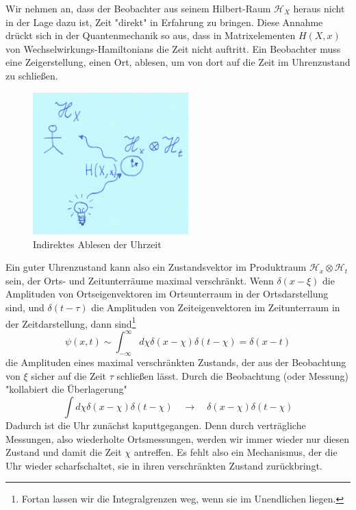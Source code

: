 \documentclass[12pt]{article}
\begin{document}
Wir nehmen an, dass der Beobachter aus seinem Hilbert-Raum $\mathscr{H}_X$ heraus nicht in der Lage dazu ist, Zeit "direkt" in Erfahrung zu bringen. Diese Annahme drückt sich in der Quantenmechanik so aus, dass in Matrixelementen $H(X,x)$ von Wechselwirkungs-Hamiltonians die Zeit nicht auftritt. Ein Beobachter muss eine Zeigerstellung, einen Ort, ablesen, um von dort auf die Zeit im Uhrenzustand zu schließen. 

\begin{figure}[!h]\begin{center}
  \includegraphics[width=6cm]{Quantenuhr.png}
  \caption{Indirektes Ablesen der Uhrzeit}
  \label{fig:clock}
\end{center}\end{figure}

Ein guter Uhrenzustand kann also ein Zustandsvektor im Produktraum $\mathscr{H}_x \otimes \mathscr{H}_t$ sein, der Orts- und Zeitunterräume maximal verschränkt. Wenn $\delta(x-\xi)$ die Amplituden von Ortseigenvektoren im Ortsunterraum in der Ortsdarstellung sind, und $\delta(t-\tau)$ die Amplituden von Zeiteigenvektoren im Zeitunterraum in der Zeitdarstellung, dann sind\footnote{Fortan lassen wir die Integralgrenzen weg, wenn sie im Unendlichen liegen.}
\begin{equation} 
\label{eq:psi_clock}
\psi(x,t) \sim \int_{-\infty}^{\infty} d\chi \delta(x-\chi) \delta(t-\chi) = \delta(x-t)
\end{equation}
die Amplituden eines maximal verschränkten Zustands, der aus der Beobachtung von $\xi$ sicher auf die Zeit $\tau$ schließen lässt. Durch die Beobachtung (oder Messung) "kollabiert die Überlagerung"
\begin{equation} 
\label{eq:collapse}
\int d\chi \delta(x-\chi) \delta(t-\chi) \quad \rightarrow \quad \delta(x-\chi)\delta(t-\chi)
\end{equation}
Dadurch ist die Uhr zunächst kaputtgegangen. Denn durch verträgliche Messungen, also wiederholte Ortsmessungen, werden wir immer wieder nur diesen Zustand und damit die Zeit $\chi$ antreffen. Es fehlt also ein Mechanismus, der die Uhr wieder scharfschaltet, sie in ihren verschränkten Zustand zurückbringt.
\end{document}
